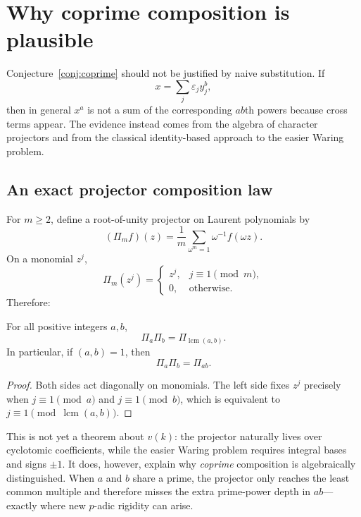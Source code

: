 \documentclass[../Axiomathic.tex]{subfiles}
\newcommand{\eps}{\varepsilon}
\newcommand{\lcm}{\operatorname{lcm}}
\begin{document}
\section{Why coprime composition is plausible}

Conjecture~\ref{conj:coprime} should not be justified by naive substitution.  If
\[
  x=\sum_j\eps_jy_j^b,
\]
then in general $x^a$ is not a sum of the corresponding $ab$th powers because cross terms appear.  The evidence instead comes from the algebra of character projectors and from the classical identity-based approach to the easier Waring problem.

\subsection{An exact projector composition law}

For $m\ge2$, define a root-of-unity projector on Laurent polynomials by
\[
  (\Pi_m f)(z)=\frac1m\sum_{\omega^m=1}\omega^{-1}f(\omega z).
\]
On a monomial $z^j$,
\[
  \Pi_m(z^j)=
  \begin{cases}
    z^j,&j\equiv1\pmod m,\\
    0,&\text{otherwise}.
  \end{cases}
\]
Therefore:

\begin{prop}\label{prop:projector}
For all positive integers $a,b$,
\begin{equation}\label{eq:projector-lcm}
  \boxed{\Pi_a\Pi_b=\Pi_{\lcm(a,b)}.}
\end{equation}
In particular, if $(a,b)=1$, then
\[
  \boxed{\Pi_a\Pi_b=\Pi_{ab}.}
\]
\end{prop}

\begin{proof}
Both sides act diagonally on monomials.  The left side fixes $z^j$ precisely when
$j\equiv1\pmod a$ and $j\equiv1\pmod b$, which is equivalent to
$j\equiv1\pmod{\lcm(a,b)}$.
\end{proof}

This is not yet a theorem about $v(k)$: the projector naturally lives over cyclotomic coefficients, while the easier Waring problem requires integral bases and signs $\pm1$.  It does, however, explain why \emph{coprime} composition is algebraically distinguished.  When $a$ and $b$ share a prime, the projector only reaches the least common multiple and therefore misses the extra prime-power depth in $ab$---exactly where new $p$-adic rigidity can arise.
\end{document}
